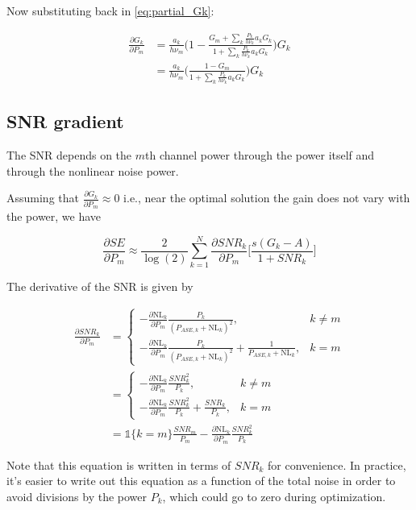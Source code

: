 \documentclass[a4paper]{article}
\begin{document}
Now substituting back in \eqref{eq:partial_Gk}:

\begin{align} \nonumber
\frac{\partial G_k}{\partial P_m} &= \frac{a_k}{h\nu_m}\Bigg(1 - \frac{G_m + \sum_k\frac{P_k}{h\nu_k}a_kG_k}{1 + \sum_k\frac{P_k}{h\nu_k}a_kG_k}\Bigg)G_k \\
& = \frac{a_k}{h\nu_m}\Bigg(\frac{1 - G_m}{1 + \sum_k\frac{P_k}{h\nu_k}a_kG_k }\Bigg)G_k 
\end{align}

\subsection{SNR gradient}
The SNR depends on the $m$th channel power through the power itself and through the nonlinear noise power. 

Assuming that $\frac{\partial G_k}{\partial P_m} \approx 0$ i.e., near the optimal solution the gain does not vary with the power, we have

\begin{equation} \label{eq:dSE_dP}
\frac{\partial SE}{\partial P_m} \approx \frac{2}{\log(2)}\sum_{k = 1}^N \frac{\partial SNR_k}{\partial P_m}\bigg [
\frac{s(G_k - A)}{1 + SNR_k}
\bigg]
\end{equation}

The derivative of the SNR is given by

\begin{align}
	\frac{\partial SNR_k}{\partial P_m} &= \begin{cases}
	-\frac{\partial \mathrm{NL}_k}{\partial P_m}\frac{P_k}{(P_{ASE, k} + \mathrm{NL}_k)^2}, & k \neq m \\
	-\frac{\partial \mathrm{NL}_k}{\partial P_m}\frac{P_k}{(P_{ASE, k} + \mathrm{NL}_k)^2} + \frac{1}{P_{ASE, k} + \mathrm{NL}_k}, & k = m
	\end{cases} \\
	&= \begin{cases}
	-\frac{\partial \mathrm{NL}_k}{\partial P_m}\frac{SNR_k^2}{P_k}, & k \neq m \\
	-\frac{\partial \mathrm{NL}_k}{\partial P_m}\frac{SNR_k^2}{P_k} + \frac{SNR_k}{P_k}, & k = m
	\end{cases} \\
	& = \mathds{1}\{k= m\}\frac{SNR_m}{P_m} - \frac{\partial \mathrm{NL}_k}{\partial P_m}\frac{SNR_k^2}{P_k}
\end{align}

Note that this equation is written in terms of $SNR_k$ for convenience. In practice, it's easier to write out this equation as a function of the total noise in order to avoid divisions by the power $P_k$, which could go to zero during optimization. 
\end{document}
